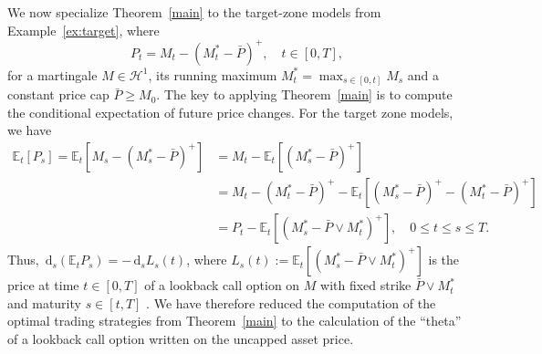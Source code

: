 \documentclass[11pt]{article}
\theoremstyle{definition}
\theoremstyle{remark}
\newtheorem{rem}[thm]{Remark}
\newcommand{\E}{\mathbb{E}} %
\newcommand{\de}{\,\mathrm{d}}
\begin{document}
We now specialize Theorem~\ref{main} to the target-zone models from Example~\ref{ex:target}, where
$$
P_t=M_t -(M^*_t-\bar{P})^+, \quad t \in [0,T],
$$
for a martingale $M\in\mathcal{H}^1$, its running maximum $M^*_t=\max_{s \in [0,t]}M_s$ and a constant price cap $\bar{P} \geq M_0$. The key to applying Theorem~\ref{main} is to compute the conditional expectation of future price changes. For the target zone models, we have
\begin{align*}
\E_t[P_s] = \E_t\left[M_s-(M^*_s-\bar{P})^+\right] &= M_t-\E_t\left[(M^*_s-\bar{P})^+\right]\\
& =M_t-(M^*_t-\bar{P})^+ - \E_t\left[(M^*_s-\bar{P})^+ - (M^*_t-\bar{P})^+\right]\\
&=P_t - \E_t\left[(M^*_s-\bar{P}\vee M^*_t)^+\right], \quad 0 \leq t \leq s \leq T.
\end{align*}
Thus, $\de_s(\E_t P_s) = -\de_s L_s(t)$, where $L_s(t):=\E_t[(M^*_s-\bar{P}\vee M^*_t)^+]$ is the price at time $t \in [0,T]$ of a lookback call option on $M$ with fixed strike $\bar{P}\vee M^*_t$ and maturity $s \in [t,T]$ . We have therefore reduced the computation of the optimal trading strategies from Theorem~\ref{main} to the calculation of the ``theta'' of a lookback call option written on the uncapped asset price.

\end{document}
